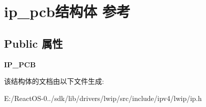 \hypertarget{structip__pcb}{}\section{ip\+\_\+pcb结构体 参考}
\label{structip__pcb}
\subsection*{Public 属性}
\begin{DoxyCompactItemize}
\item 
\mbox{\label{structip__pcb_aa8c53363aec905c3556c4ce197e24fc3}} 
{\bfseries I\+P\+\_\+\+P\+CB}
\end{DoxyCompactItemize}


该结构体的文档由以下文件生成\+:\begin{DoxyCompactItemize}
\item 
E\+:/\+React\+O\+S-\/0../sdk/lib/drivers/lwip/src/include/ipv4/lwip/ip.\+h\end{DoxyCompactItemize}
